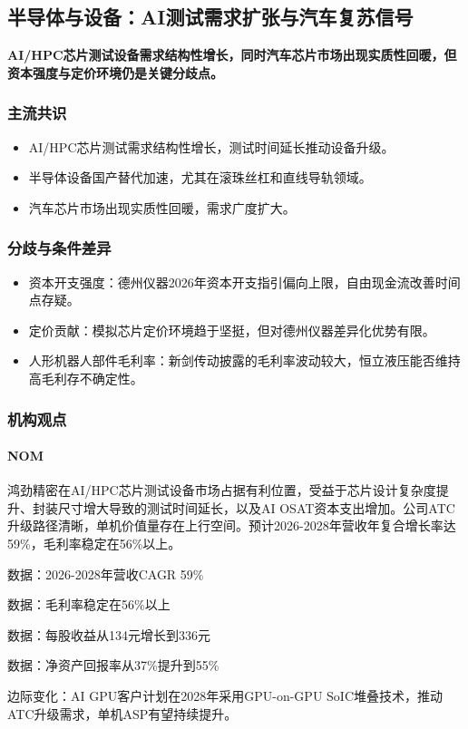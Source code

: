 \documentclass[11pt]{ctexart}
\begin{document}
\subsection{半导体与设备：AI测试需求扩张与汽车复苏信号}
\textbf{AI/HPC芯片测试设备需求结构性增长，同时汽车芯片市场出现实质性回暖，但资本强度与定价环境仍是关键分歧点。}
\subsubsection*{主流共识}
\begin{itemize}
  \item AI/HPC芯片测试需求结构性增长，测试时间延长推动设备升级。
  \item 半导体设备国产替代加速，尤其在滚珠丝杠和直线导轨领域。
  \item 汽车芯片市场出现实质性回暖，需求广度扩大。
\end{itemize}
\subsubsection*{分歧与条件差异}
\begin{itemize}
  \item 资本开支强度：德州仪器2026年资本开支指引偏向上限，自由现金流改善时间点存疑。
  \item 定价贡献：模拟芯片定价环境趋于坚挺，但对德州仪器差异化优势有限。
  \item 人形机器人部件毛利率：新剑传动披露的毛利率波动较大，恒立液压能否维持高毛利存不确定性。
\end{itemize}
\subsubsection*{机构观点}
\paragraph{NOM} 鸿劲精密在AI/HPC芯片测试设备市场占据有利位置，受益于芯片设计复杂度提升、封装尺寸增大导致的测试时间延长，以及AI OSAT资本支出增加。公司ATC升级路径清晰，单机价值量存在上行空间。预计2026-2028年营收年复合增长率达59\%，毛利率稳定在56\%以上。
{\small\color{refgray}数据：2026-2028年营收CAGR 59\%\par}
{\small\color{refgray}数据：毛利率稳定在56\%以上\par}
{\small\color{refgray}数据：每股收益从134元增长到336元\par}
{\small\color{refgray}数据：净资产回报率从37\%提升到55\%\par}
{\small\color{refgray}边际变化：AI GPU客户计划在2028年采用GPU-on-GPU SoIC堆叠技术，推动ATC升级需求，单机ASP有望持续提升。\par}
\end{document}
